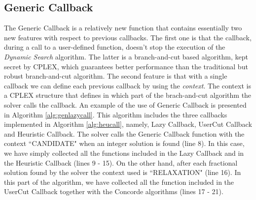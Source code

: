 \subsection{Generic Callback}
The Generic Callback is a relatively new function that contains essentially two new features with respect to previous callbacks.
The first one is that the callback, during a call to a user-defined function, doesn't stop the execution of the \textit{Dynamic Search} algorithm. The latter is a branch-and-cut based algorithm, kept secret by CPLEX, which guarantees better performance than the traditional but robust branch-and-cut algorithm.
The second feature is that with a single callback we can define each previous callback by using the \textit{context}. The context is a CPLEX structure that defines in which part of the brach-and-cut algorithm the solver calls the callback.
An example of the use of Generic Callback is presented in Algorithm \ref{alg:genlazycall}.  This algorithm includes the three callbacks implemented in Algorithm \ref{alg:heucall}, namely, Lazy Callback, UserCut Callback and Heuristic Callback. 
The solver calls the Generic Callback function with the context ``CANDIDATE" when an integer solution is found (line 8). In this case, we have simply collected all the functions included in the Lazy Callback and in the Heuristic Callback (lines 9 - 15). On the other hand, after each fractional solution found by the solver the context used is ``RELAXATION" (line 16). In this part of the algorithm, we have collected all the function included in the UserCut Callback together with the Concorde algorithms (lines 17 - 21).


